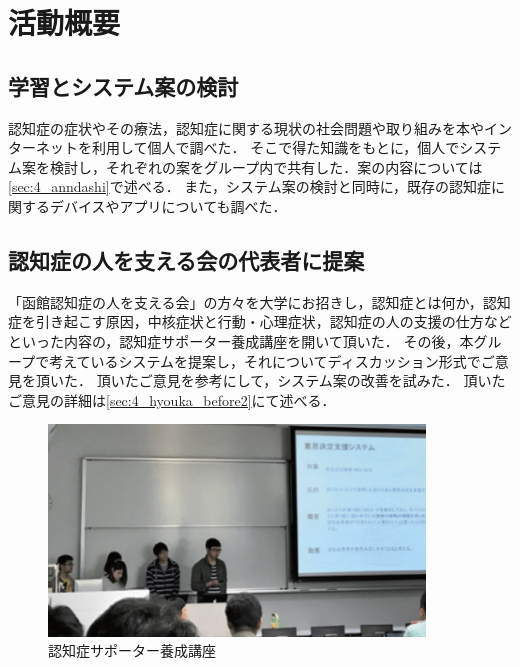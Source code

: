 \documentclass[../report]{subfiles}
\begin{document}
\section{活動概要}
\subsection{学習とシステム案の検討} \label{sec:discuss}
認知症の症状やその療法，認知症に関する現状の社会問題や取り組みを本やインターネットを利用して個人で調べた．
そこで得た知識をもとに，個人でシステム案を検討し，それぞれの案をグループ内で共有した．案の内容については\ref{sec:4_anndashi}で述べる．
また，システム案の検討と同時に，既存の認知症に関するデバイスやアプリについても調べた．

\subsection{認知症の人を支える会の代表者に提案}
「函館認知症の人を支える会」の方々を大学にお招きし，認知症とは何か，認知症を引き起こす原因，中核症状と行動・心理症状，認知症の人の支援の仕方などといった内容の，認知症サポーター養成講座を開いて頂いた．
その後，本グループで考えているシステムを提案し，それについてディスカッション形式でご意見を頂いた．
頂いたご意見を参考にして，システム案の改善を試みた．
頂いたご意見の詳細は\ref{sec:4_hyouka_before2}にて述べる．
\begin{figure}[htbp]
    \begin{center}
        \includegraphics[width=10cm]{imgs/2_idea_review1.png}
        \caption{認知症サポーター養成講座}
    \end{center}
\end{figure}
\end{document}
